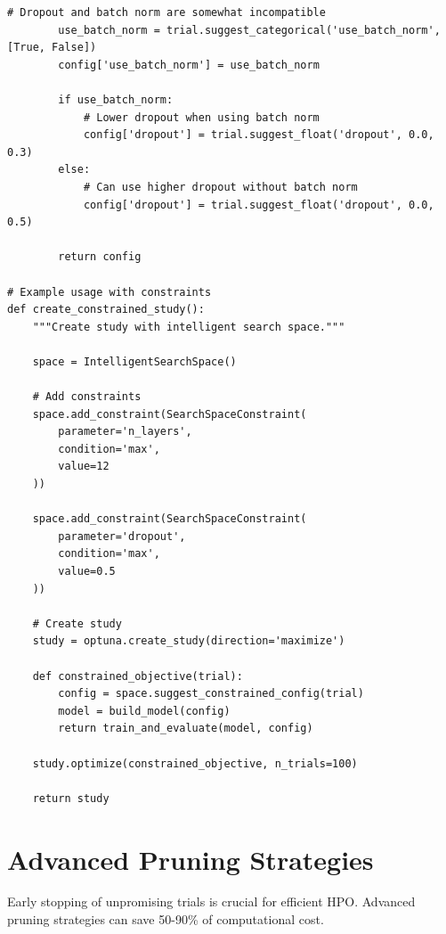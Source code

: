 \begin{lstlisting}[style=python, caption=Intelligent search space pruning]
        # Dropout and batch norm are somewhat incompatible
        use_batch_norm = trial.suggest_categorical('use_batch_norm', [True, False])
        config['use_batch_norm'] = use_batch_norm

        if use_batch_norm:
            # Lower dropout when using batch norm
            config['dropout'] = trial.suggest_float('dropout', 0.0, 0.3)
        else:
            # Can use higher dropout without batch norm
            config['dropout'] = trial.suggest_float('dropout', 0.0, 0.5)

        return config

# Example usage with constraints
def create_constrained_study():
    """Create study with intelligent search space."""

    space = IntelligentSearchSpace()

    # Add constraints
    space.add_constraint(SearchSpaceConstraint(
        parameter='n_layers',
        condition='max',
        value=12
    ))

    space.add_constraint(SearchSpaceConstraint(
        parameter='dropout',
        condition='max',
        value=0.5
    ))

    # Create study
    study = optuna.create_study(direction='maximize')

    def constrained_objective(trial):
        config = space.suggest_constrained_config(trial)
        model = build_model(config)
        return train_and_evaluate(model, config)

    study.optimize(constrained_objective, n_trials=100)

    return study
\end{lstlisting}

\section{Advanced Pruning Strategies}

Early stopping of unpromising trials is crucial for efficient HPO. Advanced pruning strategies can save 50-90\% of computational cost.

